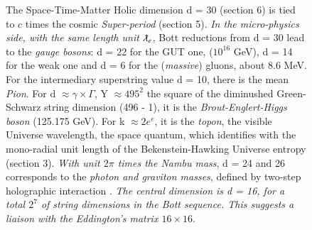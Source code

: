 \documentclass[twoside,draft]{article}
\begin{document}
\begin{sloppypar}
\begin{figure}
{The Space-Time-Matter Holic dimension d = 30 (section 6) is tied to $c$ times the cosmic \textit{Super-period} (section 5). 
\textit{In the micro-physics side, with the same length unit $\lambdabar_e$}, Bott reductions from d = 30 lead to the \textit{gauge bosons}: d = 22 for the GUT one, ($10^{16}$ GeV), d = 14 for the weak one and d = 6 for the (\textit{massive}) gluons, about 8.6 MeV.
For the intermediary superstring value d = 10, there is the mean \textit{Pion}. For d $\approx \gamma \times \Gamma$, Y $\approx 495^2$ the square of the diminushed Green-Schwarz string dimension (496 - 1), it is the \textit{Brout-Englert-Higgs boson} (125.175 GeV). For k $\approx 2e^e$, it is the \textit{topon}, the visible Universe wavelength, the space quantum, which identifies with the mono-radial unit length of the Bekenstein-Hawking Universe entropy (section 3).
   \textit{With unit $2\pi$ times the Nambu mass}, d = 24 and 26 corresponds to the \textit{photon and graviton masses}, defined by two-step holographic interaction \cite{Sanchez1}.}
    \textit{The central dimension is d = 16, for a total $2^7$ of string dimensions in the Bott sequence. This suggests a liaison with the Eddington's matrix $16\times 16$}.
\label{fig:figure_label}
\end{figure}



\end{sloppypar}
\end{document}

